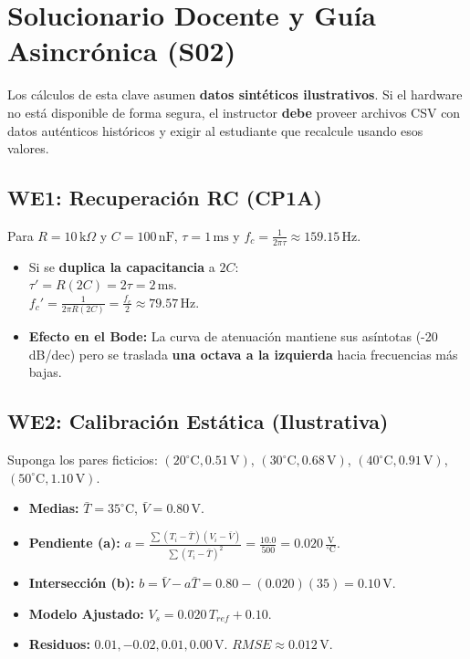 \documentclass[11pt, a4paper]{article}
\begin{document}
\section*{Solucionario Docente y Guía Asincrónica (S02)}

\begin{tcolorbox}[colback=ucbblue!5, colframe=ucbblue, title=\textbf{Nota de Fallback (Datos Ilustrativos)}]
Los cálculos de esta clave asumen \textbf{datos sintéticos ilustrativos}. Si el hardware no está disponible de forma segura, el instructor \textbf{debe} proveer archivos CSV con datos auténticos históricos y exigir al estudiante que recalcule usando esos valores.
\end{tcolorbox}

\subsection*{WE1: Recuperación RC (CP1A)}
Para $R=10\,\text{k}\Omega$ y $C=100\,\text{nF}$, $\tau = 1\,\text{ms}$ y $f_c = \frac{1}{2\pi \tau} \approx 159.15\,\text{Hz}$.
\begin{itemize}
    \item Si se \textbf{duplica la capacitancia} a $2C$: \\
    $\tau' = R(2C) = 2\tau = 2\,\text{ms}$. \\
    $f_c' = \frac{1}{2\pi R(2C)} = \frac{f_c}{2} \approx 79.57\,\text{Hz}$.
    \item \textbf{Efecto en el Bode:} La curva de atenuación mantiene sus asíntotas (-20 dB/dec) pero se traslada \textbf{una octava a la izquierda} hacia frecuencias más bajas.
\end{itemize}

\subsection*{WE2: Calibración Estática (Ilustrativa)}
Suponga los pares ficticios: $(20^\circ\text{C}, 0.51\,\text{V})$, $(30^\circ\text{C}, 0.68\,\text{V})$, $(40^\circ\text{C}, 0.91\,\text{V})$, $(50^\circ\text{C}, 1.10\,\text{V})$.
\begin{itemize}
    \item \textbf{Medias:} $\bar{T} = 35^\circ\text{C}$, $\bar{V} = 0.80\,\text{V}$.
    \item \textbf{Pendiente (a):} $a = \frac{\sum (T_i - \bar{T})(V_i - \bar{V})}{\sum (T_i - \bar{T})^2} = \frac{10.0}{500} = 0.020\,\frac{\text{V}}{^\circ\text{C}}$.
    \item \textbf{Intersección (b):} $b = \bar{V} - a\bar{T} = 0.80 - (0.020)(35) = 0.10\,\text{V}$.
    \item \textbf{Modelo Ajustado:} $V_s = 0.020\,T_{ref} + 0.10$.
    \item \textbf{Residuos:} $0.01, -0.02, 0.01, 0.00\,\text{V}$. $RMSE \approx 0.012\,\text{V}$.
\end{itemize}
\end{document}
